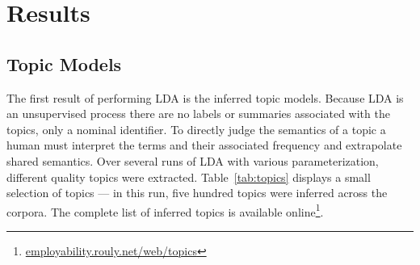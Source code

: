 \section{Results}

\subsection{Topic Models}

The first result of performing LDA is the inferred topic models.
Because LDA is an unsupervised process there are no labels or summaries associated with the topics, only a nominal identifier.
To directly judge the semantics of a topic a human must interpret the terms and their associated frequency and extrapolate shared semantics.
Over several runs of LDA with various parameterization, different quality topics were extracted.
Table~\ref{tab:topics} displays a small selection of topics --- in this run, five hundred topics were inferred across the corpora.
The complete list of inferred topics is available online\footnote{\href{https://employability.rouly.net/web/topics}{employability.rouly.net/web/topics}}.

